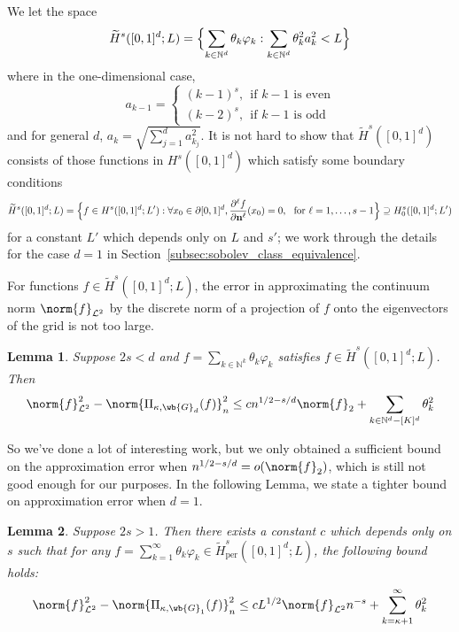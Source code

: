 \documentclass{article}
\newcommand{\1}{\mathbf{1}}
\newcommand{\Leb}{\mathcal{L}}
\newcommand{\wt}[1]{\widetilde{#1}}
\theoremstyle{alden}
\theoremstyle{aldenthm}
\newtheorem{lemma}{Lemma}
\theoremstyle{definition}
\theoremstyle{remark}
\begin{document}
We let the space 
\begin{equation*}
\wt{H}^{s}([0,1]^d;L) = \Bigl\{ \sum_{k \in \mathbb{N}^d} \theta_k \varphi_k: \sum_{k \in \mathbb{N}^d} \theta_k^2 a_k^{2} < L \Bigr\}
\end{equation*}
where in the one-dimensional case,
\begin{equation*}
a_{k - 1} =
\begin{cases*}
(k - 1)^s,~~ \textrm{if $k - 1$ is even} \\
(k - 2)^s,~~ \textrm{if $k - 1$ is odd}
\end{cases*}
\end{equation*}
and for general $d$, $a_k = \sqrt{\sum_{j = 1}^{d} a_{k_j}^2}$. It is not hard to show that $\wt{H}^s([0,1]^d)$ consists of those functions in $H^s([0,1]^d)$ which satisfy some boundary conditions
\begin{equation*}
\wt{H}^s([0,1]^d;L) = \Bigl\{f \in H^{s}([0,1]^d;L'): \forall x_0 \in \partial [0,1]^d, \frac{\partial^{\ell} f}{\partial \mathbf{n}^{\ell}}(x_0) = 0,~~\textrm{for $\ell = 1,\ldots,s-1$} \Bigr \} \supseteq H_0^s([0,1]^d;L')
\end{equation*}
for a constant $L'$ which depends only on $L$ and $s'$; we work through the details for the case $d = 1$ in Section~\ref{subsec:sobolev_class_equivalence}.

For functions $f \in \wt{H}^{s}([0,1]^d;L)$, the error in approximating the continuum norm $\norm{f}_{\Leb^2}$ by the discrete norm of a projection of $f$ onto the eigenvectors of the grid is not too large. 

\begin{lemma}
	\label{lem:grid_sobolev_approximation_error_4}
	Suppose $2s < d$ and $f = \sum_{k \in \mathbb{N}^k} \theta_k \varphi_k$ satisfies $f \in \wt{H}^{s}([0,1]^d;L)$. Then
	\begin{equation*}
	\norm{f}_{\Leb^2}^2 - \norm{\Pi_{\kappa,\wb{G}_d}(f)}_{n}^2 \leq c n^{1/2 - s/d} \norm{f}_2 + \sum_{k \in \mathbb{N}^d - [K]^d} \theta_k^2
	\end{equation*}
\end{lemma}

So we've done a lot of interesting work, but we only obtained a sufficient bound on the approximation error when $n^{1/2 - s/d} = o(\norm{f}_2)$, which is still not good enough for our purposes. In the following Lemma, we state a tighter bound on approximation error when $d = 1$.
\begin{lemma}
	\label{lem:grid_sobolev_approximation_error_5}
	Suppose $2s > 1$. Then there exists a constant $c$ which depends only on $s$ such that for any $f = \sum_{k = 1}^{\infty} \theta_k \varphi_k \in \wt{H}_{\textrm{per}}^{s}([0,1]^d;L)$, the following bound holds:
	\begin{equation*}
	\norm{f}_{\Leb^2}^2 - \norm{\Pi_{\kappa,\wb{G}_1}(f)}_{n}^2 \leq c L^{1/2} \norm{f}_{\Leb^2} n^{-s} + \sum_{k = \kappa + 1}^{\infty} \theta_k^2
	\end{equation*} 
\end{lemma}
\end{document}
